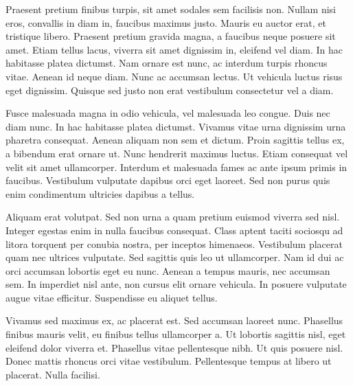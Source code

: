 \documentclass[12pt,a4paper,openright,twoside]{report}
\begin{document}
Praesent pretium finibus turpis, sit amet sodales sem facilisis non. Nullam nisi eros, convallis in diam in, faucibus maximus justo. Mauris eu auctor erat, et tristique libero. Praesent pretium gravida magna, a faucibus neque posuere sit amet. Etiam tellus lacus, viverra sit amet dignissim in, eleifend vel diam. In hac habitasse platea dictumst. Nam ornare est nunc, ac interdum turpis rhoncus vitae. Aenean id neque diam. Nunc ac accumsan lectus. Ut vehicula luctus risus eget dignissim. Quisque sed justo non erat vestibulum consectetur vel a diam.

Fusce malesuada magna in odio vehicula, vel malesuada leo congue. Duis nec diam nunc. In hac habitasse platea dictumst. Vivamus vitae urna dignissim urna pharetra consequat. Aenean aliquam non sem et dictum. Proin sagittis tellus ex, a bibendum erat ornare ut. Nunc hendrerit maximus luctus. Etiam consequat vel velit sit amet ullamcorper. Interdum et malesuada fames ac ante ipsum primis in faucibus. Vestibulum vulputate dapibus orci eget laoreet. Sed non purus quis enim condimentum ultricies dapibus a tellus.

Aliquam erat volutpat. Sed non urna a quam pretium euismod viverra sed nisl. Integer egestas enim in nulla faucibus consequat. Class aptent taciti sociosqu ad litora torquent per conubia nostra, per inceptos himenaeos. Vestibulum placerat quam nec ultrices vulputate. Sed sagittis quis leo ut ullamcorper. Nam id dui ac orci accumsan lobortis eget eu nunc. Aenean a tempus mauris, nec accumsan sem. In imperdiet nisl ante, non cursus elit ornare vehicula. In posuere vulputate augue vitae efficitur. Suspendisse eu aliquet tellus.

Vivamus sed maximus ex, ac placerat est. Sed accumsan laoreet nunc. Phasellus finibus mauris velit, eu finibus tellus ullamcorper a. Ut lobortis sagittis nisl, eget eleifend dolor viverra et. Phasellus vitae pellentesque nibh. Ut quis posuere nisl. Donec mattis rhoncus orci vitae vestibulum. Pellentesque tempus at libero ut placerat. Nulla facilisi.
\end{document}
